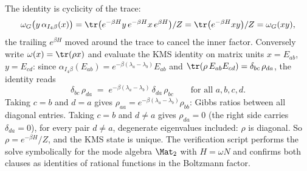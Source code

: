 The identity is cyclicity of the trace:
\[
\omega_G\bigl(y\,\alpha_{I_4\beta}(x)\bigr) = \tr\bigl(e^{-\beta H}y\,e^{-\beta H}x\,e^{\beta H}\bigr)/Z = \tr\bigl(e^{-\beta H}xy\bigr)/Z = \omega_G(xy),
\]
the trailing $e^{\beta H}$ moved around the trace to cancel the inner factor. Conversely write $\omega(x) = \tr(\rho x)$ and evaluate the KMS identity on matrix units $x = E_{ab}$, $y = E_{cd}$: since $\alpha_{I_4\beta}(E_{ab}) = e^{-\beta(\lambda_a - \lambda_b)}E_{ab}$ and $\tr(\rho\,E_{ab}E_{cd}) = \delta_{bc}\,\rho_{da}$, the identity reads
\[
\delta_{bc}\,\rho_{da} \;=\; e^{-\beta(\lambda_a - \lambda_b)}\,\delta_{da}\,\rho_{bc}
\qquad \text{for all } a, b, c, d.
\]
Taking $c = b$ and $d = a$ gives $\rho_{aa} = e^{-\beta(\lambda_a - \lambda_b)}\rho_{bb}$: Gibbs ratios between all diagonal entries. Taking $c = b$ and $d \neq a$ gives $\rho_{da} = 0$ (the right side carries $\delta_{da} = 0$), for every pair $d \neq a$, degenerate eigenvalues included: $\rho$ is diagonal. So $\rho = e^{-\beta H}/Z$, and the KMS state is unique. The verification script performs the solve symbolically for the mode algebra $\Mat_2$ with $H = \omega N$ and confirms both clauses as identities of rational functions in the Boltzmann factor.
